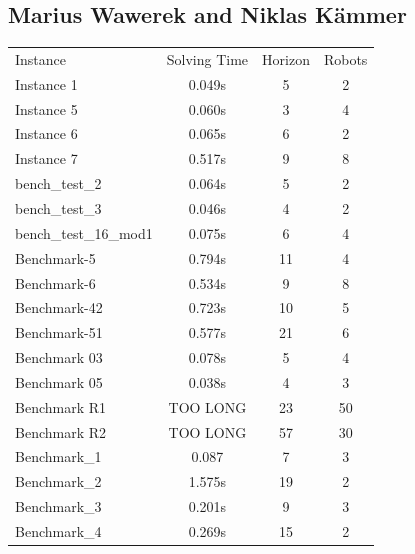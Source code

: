 \documentclass[runningheads]{llncs}
\begin{document}
\subsection{Marius Wawerek and Niklas Kämmer}
\begin{tabular}[h]{l|c|c|c}
Instance & Solving Time & Horizon & Robots \\
Instance 1 & 0.049s & 5 & 2 \\
Instance 5 & 0.060s  & 3 & 4 \\
Instance 6 & 0.065s & 6 & 2 \\
Instance 7 & 0.517s  & 9 & 8 \\
bench\_test\_2 & 0.064s & 5 & 2 \\
bench\_test\_3 & 0.046s & 4 & 2 \\
bench\_test\_16\_mod1 & 0.075s & 6 & 4 \\
Benchmark-5 & 0.794s & 11 & 4 \\
Benchmark-6 & 0.534s & 9 & 8 \\
Benchmark-42 & 0.723s & 10 & 5 \\ 
Benchmark-51 & 0.577s & 21 & 6 \\
Benchmark 03 & 0.078s & 5 & 4 \\
Benchmark 05 & 0.038s & 4 & 3 \\
Benchmark R1 & TOO LONG & 23 & 50 \\
Benchmark R2 & TOO LONG & 57 & 30 \\
Benchmark\_1 & 0.087 & 7 & 3 \\ 
Benchmark\_2 & 1.575s & 19 & 2 \\
Benchmark\_3 & 0.201s & 9 & 3 \\
Benchmark\_4 & 0.269s & 15 & 2 \\
\end{tabular}
\end{document}
